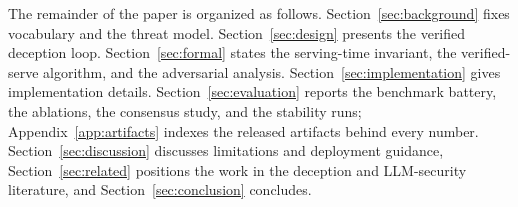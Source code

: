 The remainder of the paper is organized as follows.
Section~\ref{sec:background} fixes vocabulary and the threat model.
Section~\ref{sec:design} presents the verified deception loop.
Section~\ref{sec:formal} states the serving-time invariant, the verified-serve
algorithm, and the adversarial analysis.
Section~\ref{sec:implementation} gives implementation details.
Section~\ref{sec:evaluation} reports the benchmark battery, the ablations,
the consensus study, and the stability runs; Appendix~\ref{app:artifacts}
indexes the released artifacts behind every number.
Section~\ref{sec:discussion} discusses limitations and deployment
guidance, Section~\ref{sec:related} positions the work in the deception
and LLM-security literature, and Section~\ref{sec:conclusion} concludes.

